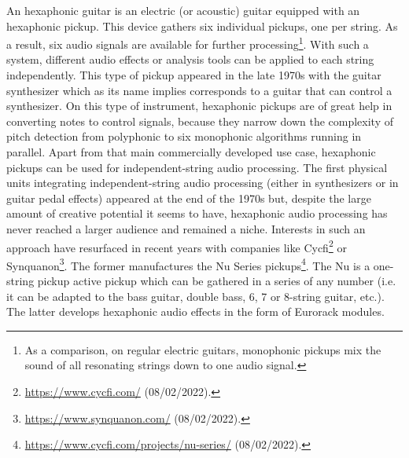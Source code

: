 \documentclass{article}
\begin{document}
An hexaphonic guitar is an electric (or acoustic) guitar equi\-pped with an hexaphonic pickup. This device gathers six individual pickups, one per string. As a result, six audio signals are available for further processing\footnote{As a comparison, on regular electric guitars, monophonic pickups mix the sound of all resonating strings down to one audio signal. }. With such a system, different audio effects or analysis tools can be applied to each string independently. This type of pickup appeared in the late 1970s with the guitar synthesizer which as its name implies corresponds to a guitar that can control a synthesizer. On this type of instrument, hexaphonic pickups are of great help in converting notes to control signals, because they narrow down the complexity of pitch detection from polyphonic to six monophonic algorithms running in parallel. Apart from that main commercially developed use case, hexaphonic pickups can be used for independent-string audio processing. The first physical units integrating independent-string audio processing (either in synthesizers or in guitar pedal effects) appeared at the end of the 1970s 
but, despite the large amount of creative potential it seems to have, hexaphonic audio processing has never reached a larger audience and remained a niche.  Interests in such an approach have resurfaced in recent years with companies like Cycfi\footnote{\url{https://www.cycfi.com/} (08/02/2022).} or Synquanon\footnote{\url{https://www.synquanon.com/} (08/02/2022).}. The former manufactures the Nu Series pickups\footnote{\url{https://www.cycfi.com/projects/nu-series/} (08/02/2022).}. The Nu is a one-string pickup active pickup which can be gathered in a series of any number (i.e. it can be adapted to the bass guitar, double bass, 6, 7 or 8-string guitar, etc.). The latter develops hexaphonic audio effects in the form of Eurorack modules. 
\end{document}
